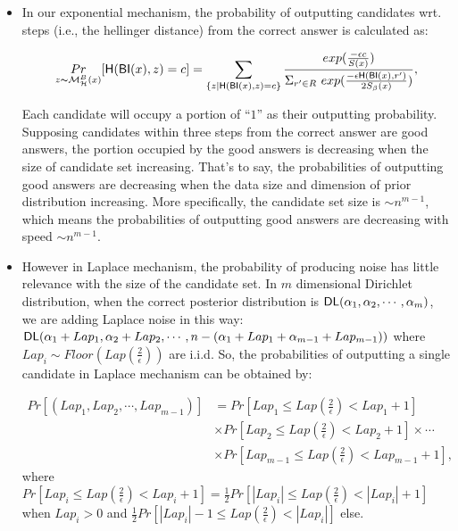 \documentclass[sigconf]{acmart}
\begin{document}
\begin{itemize}

	\item In our exponential mechanism, the probability of outputting candidates wrt. steps (i.e., the hellinger distance) from the correct answer is calculated as:

	\begin{equation*}
	\underset{z \thicksim \mathcal{M}^{B}_{\mathcal{H}}(x)}{Pr}[ \mathsf{H}(\mathsf{BI}(x), z) = c] = \sum\limits_{\{z| \mathsf{H}(\mathsf{BI}(x), z) = c\}}\frac{exp(\frac{- \epsilon c}{S(x)})}
	{\Sigma_{r' \in R}\ exp(\frac{-\epsilon \mathsf{H}(\mathsf{BI}(x),r')}{2 S_\beta(x)})},
	\end{equation*}

	Each candidate will occupy a portion of ``$1$'' as their outputting probability. Supposing candidates within three steps from the correct answer are good answers, the portion occupied by the good answers is decreasing when the size of candidate set increasing. That's to say, the probabilities of outputting good answers are decreasing when the data size and dimension of prior distribution increasing. More specifically, the candidate set size is $\sim n^{m-1}$, which means the probabilities of outputting good answers are decreasing with speed $\sim n^{m-1}$.

	\item However in Laplace mechanism, the probability of producing noise has little relevance with the size of the candidate set. In $m$ dimensional Dirichlet distribution, when the correct posterior distribution is $\mathsf{DL}(\alpha_1, \alpha_2, \cdots, \alpha_m)$, we are adding Laplace noise in this way: $\mathsf{DL}(\alpha_1 + Lap_1, \alpha_2 + Lap_2, \cdots, n - (\alpha_1 + Lap_1 + \alpha_{m-1} + Lap_{m-1}))$ where $Lap_i \sim Floor(Lap(\frac{2}{\epsilon}))$ are i.i.d. So, the probabilities of outputting a single candidate in Laplace mechanism can be obtained by: 

	\begin{equation*}
	\begin{split}
	Pr[(Lap_1, Lap_2, \cdots, Lap_{m-1})]  
	& = Pr[Lap_1 \leq Lap(\frac{2}{\epsilon}) < Lap_1 + 1] \\
	& \times Pr[Lap_2 \leq Lap(\frac{2}{\epsilon}) < Lap_2 + 1] \times \cdots \\
	& \times Pr[Lap_{m-1} \leq Lap(\frac{2}{\epsilon}) < Lap_{m-1} + 1],
	\end{split}
	\end{equation*}
	where $Pr[Lap_i \leq Lap(\frac{2}{\epsilon}) < Lap_i + 1] = \frac{1}{2} Pr[|Lap_i| \leq Lap(\frac{2}{\epsilon}) < |Lap_i| + 1]$ when $Lap_i > 0$ and $\frac{1}{2} Pr[|Lap_i| - 1 \leq Lap(\frac{2}{\epsilon}) < |Lap_i|]$ else.


\end{itemize}
\end{document}
